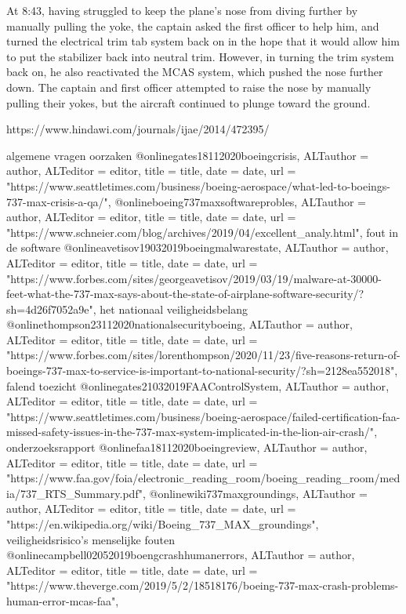 {{{{{{{{{At 8:43, having struggled to keep the plane's nose from diving further by manually pulling the yoke, the captain asked the first officer to help him, and turned the electrical trim tab system back on in the hope that it would allow him to put the stabilizer back into neutral trim. However, in turning the trim system back on, he also reactivated the MCAS system, which pushed the nose further down. The captain and first officer attempted to raise the nose by manually pulling their yokes, but the aircraft continued to plunge toward the ground.

https://www.hindawi.com/journals/ijae/2014/472395/ 
\cite{caliskan09112013747boeingkalman}

algemene vragen
oorzaken
@online{gates18112020boeingcrisis,	ALTauthor = {author},	ALTeditor = {editor},	title = {title},	date = {date},	url = {"https://www.seattletimes.com/business/boeing-aerospace/what-led-to-boeings-737-max-crisis-a-qa/"},}
@online{boeing737maxsoftwareprobles,	ALTauthor = {author},	ALTeditor = {editor},	title = {title},	date = {date},	url = {"https://www.schneier.com/blog/archives/2019/04/excellent_analy.html"},}
fout in de software
@online{avetisov19032019boeingmalwarestate,	ALTauthor = {author},	ALTeditor = {editor},	title = {title},	date = {date},	url = {"https://www.forbes.com/sites/georgeavetisov/2019/03/19/malware-at-30000-feet-what-the-737-max-says-about-the-state-of-airplane-software-security/?sh=4d26f7052a9e"},}
het nationaal veiligheidsbelang
@online{thompson23112020nationalsecurityboeing,	ALTauthor = {author},	ALTeditor = {editor},	title = {title},	date = {date},	url = {"https://www.forbes.com/sites/lorenthompson/2020/11/23/five-reasons-return-of-boeings-737-max-to-service-is-important-to-national-security/?sh=2128ea552018"},}
falend toezicht
@online{gates21032019FAAControlSystem,	ALTauthor = {author},	ALTeditor = {editor},	title = {title},	date = {date},	url = {"https://www.seattletimes.com/business/boeing-aerospace/failed-certification-faa-missed-safety-issues-in-the-737-max-system-implicated-in-the-lion-air-crash/"},}
onderzoeksrapport
@online{faa18112020boeingreview,	ALTauthor = {author},	ALTeditor = {editor},	title = {title},	date = {date},	url = {"https://www.faa.gov/foia/electronic_reading_room/boeing_reading_room/media/737_RTS_Summary.pdf"},}
@online{wiki737maxgroundings,	ALTauthor = {author},	ALTeditor = {editor},	title = {title},	date = {date},	url = {"https://en.wikipedia.org/wiki/Boeing_737_MAX_groundings"},}
veiligheidsrisico's
menselijke fouten
@online{campbell02052019boengcrashhumanerrors,	ALTauthor = {author},	ALTeditor = {editor},	title = {title},	date = {date},	url = {"https://www.theverge.com/2019/5/2/18518176/boeing-737-max-crash-problems-human-error-mcas-faa"},}
}}}}}}}}}
